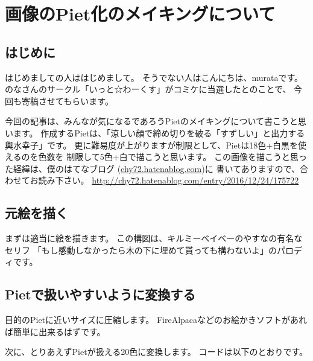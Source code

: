 \chapter[画像のPiet化のメイキングについて]{画像のPiet化のメイキングについて}

\author{murata}

\section{はじめに}

はじめましての人ははじめまして。 そうでない人はこんにちは、murataです。
のなさんのサークル「いっと☆わーくす」がコミケに当選したとのことで、
今回も寄稿させてもらいます。

今回の記事は、みんなが気になるであろうPietのメイキングについて書こうと思います。
作成するPietは、「涼しい顔で締め切りを破る「すずしい」と出力する輿水幸子」です。
更に難易度が上がりますが制限として、Pietは18色+白黒を使えるのを色数を
制限して5色+白で描こうと思います。
この画像を描こうと思った経緯は、僕のはてなブログ
(\url{chy72.hatenablog.com})に 書いてありますので、合わせてお読み下さい。
\url{http://chy72.hatenablog.com/entry/2016/12/24/175722}

\section{元絵を描く}


まずは適当に絵を描きます。
この構図は、キルミーベイベーのやすなの有名なセリフ
「もし感動しなかったら木の下に埋めて貰っても構わないよ」のパロディです。

\section{Pietで扱いやすいように変換する}

目的のPietに近いサイズに圧縮します。
FireAlpacaなどのお絵かきソフトがあれば簡単に出来るはずです。


次に、とりあえずPietが扱える20色に変換します。
コードは以下のとおりです。

